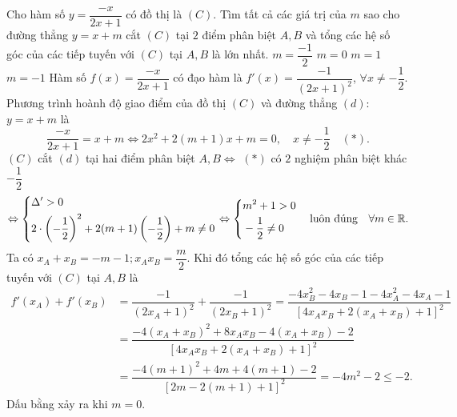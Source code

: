 \begin{ex}%
Cho hàm số $y=\dfrac{-x}{2x+1}$ có đồ thị là $(C)$. Tìm tất cả các giá trị của $m$ sao cho đường thẳng $y=x+m$ cắt $(C)$ tại $2$ điểm phân biệt $A,B$ và tổng các hệ số góc của các tiếp tuyến với $(C)$ tại $A,B$ là lớn nhất.
\choice
{$m=\dfrac{-1}{2}$}
{\True $m=0$}
{ $m=1$}
{$m=-1$}
\loigiai
{
Hàm số $f(x)=\dfrac{-x}{2x+1}$ có đạo hàm là $f'(x)=\dfrac{-1}{(2x+1)^2}$, $\forall x\neq -\dfrac{1}{2}$.
Phương trình hoành độ giao điểm của đồ thị $(C)$ và đường thẳng $(d):$ $y=x+m$ là
$$\dfrac{-x}{2x+1}=x+m\Leftrightarrow 2x^2+2(m+1)x+m=0,\quad x\neq -\dfrac{1}{2}\quad (*).$$
$(C)$ cắt $(d)$ tại hai điểm phân biệt $A, B\Leftrightarrow$ $(*)$ có $2$ nghiệm phân biệt khác $-\dfrac{1}{2}$
$$\Leftrightarrow\left\{\begin{aligned}&\Delta'>0\\&2\cdot\left(-\dfrac{1}{2}\right)^2+2(m+1)\left(-\dfrac{1}{2}\right)+m\neq 0\end{aligned}\right.
\Leftrightarrow\left\{\begin{aligned}&m^2+1>0\\&-\dfrac{1}{2}\neq 0\end{aligned}\right.\quad \text{luôn đúng}\quad\forall m\in\mathbb{R}.$$
Ta có $x_A+x_B=-m-1; x_Ax_B=\dfrac{m}{2}$. Khi đó tổng các hệ số góc của các tiếp tuyến với $(C)$ tại $A,B$ là
$$\begin{aligned}f'(x_A)+f'(x_B)&=\dfrac{-1}{(2x_A+1)^2}+\dfrac{-1}{(2x_B+1)^2}=\dfrac{-4x_B^2-4x_B-1-4x_A^2-4x_A-1}{[4x_Ax_B+2(x_A+x_B)+1]^2}\\
&=\dfrac{-4(x_A+x_B)^2+8x_Ax_B-4(x_A+x_B)-2}{[4x_Ax_B+2(x_A+x_B)+1]^2}\\
&=\dfrac{-4(m+1)^2+4m+4(m+1)-2}{[2m-2(m+1)+1]^2}=-4m^2-2\leq -2.
\end{aligned}$$
Dấu bằng xảy ra khi $m=0$.
}
\end{ex}
